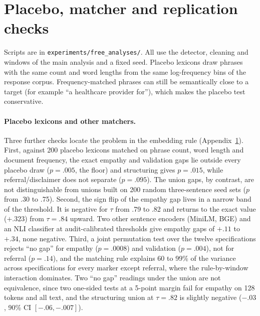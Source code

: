 \documentclass[11pt]{article}
\begin{document}
\section{Placebo, matcher and replication checks}
\label{app:revision-checks}
Scripts are in \texttt{experiments/free\_analyses/}. All use the detector,
cleaning and windows of the main analysis and a fixed seed. Placebo lexicons
draw phrases with the same count and word lengths from the same
log-frequency bins of the response corpus. Frequency-matched phrases can
still be semantically close to a target (for example ``a healthcare provider
for''), which makes the placebo test conservative.

\paragraph{Placebo lexicons and other matchers.}
Three further checks locate the problem in the embedding rule
(Appendix~\ref{app:revision-checks}). First, against 200 placebo lexicons
matched on phrase count, word length and document frequency, the exact
empathy and validation gaps lie outside every placebo draw ($p=.005$, the
floor) and structuring gives $p=.015$, while referral/disclaimer does not separate
($p=.095$). The union gaps, by contrast, are not distinguishable from unions
built on 200 random three-sentence seed sets ($p$ from .30 to .75). Second,
the sign flip of the empathy gap lives in a narrow band of the threshold. It
is negative for $\tau$ from .79 to .82 and returns to the exact value
($+.323$) from $\tau=.84$ upward. Two other sentence encoders (MiniLM, BGE)
and an NLI classifier at audit-calibrated thresholds give empathy gaps of
$+.11$ to $+.34$, none negative. Third, a joint permutation test over the
twelve specifications rejects ``no gap'' for empathy ($p=.0008$) and
validation ($p=.004$), not for referral ($p=.14$), and the matching rule
explains 60 to 99\% of the variance across specifications for every marker
except referral, where the rule-by-window interaction dominates. Two
``no gap'' readings under the union are not equivalence, since two one-sided tests
at a 5-point margin fail for empathy on 128 tokens and all text, and the
structuring union at $\tau=.82$ is slightly negative ($-.03$, 90\% CI
$[-.06,-.007]$).
\end{document}
